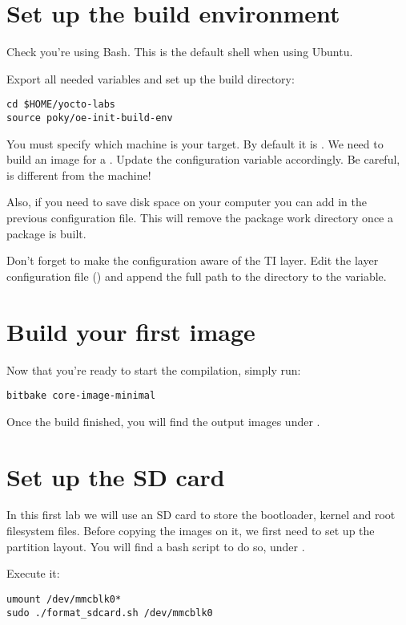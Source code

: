 \section{Set up the build environment}

Check you're using Bash. This is the default shell when using Ubuntu.

Export all needed variables and set up the build directory:
\begin{verbatim}
cd $HOME/yocto-labs
source poky/oe-init-build-env
\end{verbatim}

You must specify which machine is your target. By default it
is . We need to build an image for a .
Update the  configuration variable accordingly. Be
careful,  is different from the 
machine!

Also, if you need to save disk space on your computer you can add  in the previous configuration file. This will remove the
package work directory once a package is built.

Don't forget to make the configuration aware of the TI layer. Edit the
layer configuration file () and append the
full path to the  directory to the  variable.

\section{Build your first image}

Now that you're ready to start the compilation, simply run:
\begin{verbatim}
bitbake core-image-minimal
\end{verbatim}

Once the build finished, you will find the output images under
.

\section{Set up the SD card}

In this first lab we will use an SD card to store the bootloader, kernel and
root filesystem files. Before copying the images on it, we first need to set up the
partition layout. You will find a bash script to do so, under
.

Execute it:
\begin{verbatim}
umount /dev/mmcblk0*
sudo ./format_sdcard.sh /dev/mmcblk0
\end{verbatim}

